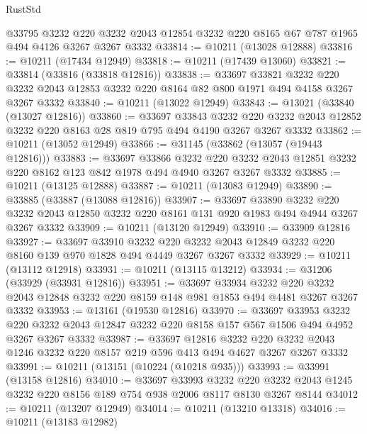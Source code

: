 \begin{lexlean}{RustStd}
\begin{coremodule}
{\begin{coremodule}
{{{{{{{{{{{{{{{{{{{{{{{{{    @33795
    @3232
    @220
    @3232
    @2043
    @12854
    @3232
    @220
    @8165
    @67
    @787
    @1965
    @494
    @4126
    @3267
    @3267
    @3332
@33814 := @10211 (@13028 @12888)
@33816 := @10211 (@17434 @12949)
@33818 := @10211 (@17439 @13060)
@33821 := @33814 (@33816 (@33818 @12816))
@33838 := @33697
    @33821
    @3232
    @220
    @3232
    @2043
    @12853
    @3232
    @220
    @8164
    @82
    @800
    @1971
    @494
    @4158
    @3267
    @3267
    @3332
@33840 := @10211 (@13022 @12949)
@33843 := @13021 (@33840 (@13027 @12816))
@33860 := @33697
    @33843
    @3232
    @220
    @3232
    @2043
    @12852
    @3232
    @220
    @8163
    @28
    @819
    @795
    @494
    @4190
    @3267
    @3267
    @3332
@33862 := @10211 (@13052 @12949)
@33866 := @31145 (@33862 (@13057 (@19443 @12816)))
@33883 := @33697
    @33866
    @3232
    @220
    @3232
    @2043
    @12851
    @3232
    @220
    @8162
    @123
    @842
    @1978
    @494
    @4940
    @3267
    @3267
    @3332
@33885 := @10211 (@13125 @12888)
@33887 := @10211 (@13083 @12949)
@33890 := @33885 (@33887 (@13088 @12816))
@33907 := @33697
    @33890
    @3232
    @220
    @3232
    @2043
    @12850
    @3232
    @220
    @8161
    @131
    @920
    @1983
    @494
    @4944
    @3267
    @3267
    @3332
@33909 := @10211 (@13120 @12949)
@33910 := @33909 @12816
@33927 := @33697
    @33910
    @3232
    @220
    @3232
    @2043
    @12849
    @3232
    @220
    @8160
    @139
    @970
    @1828
    @494
    @4449
    @3267
    @3267
    @3332
@33929 := @10211 (@13112 @12918)
@33931 := @10211 (@13115 @13212)
@33934 := @31206 (@33929 (@33931 @12816))
@33951 := @33697
    @33934
    @3232
    @220
    @3232
    @2043
    @12848
    @3232
    @220
    @8159
    @148
    @981
    @1853
    @494
    @4481
    @3267
    @3267
    @3332
@33953 := @13161 (@19530 @12816)
@33970 := @33697
    @33953
    @3232
    @220
    @3232
    @2043
    @12847
    @3232
    @220
    @8158
    @157
    @567
    @1506
    @494
    @4952
    @3267
    @3267
    @3332
@33987 := @33697
    @12816
    @3232
    @220
    @3232
    @2043
    @1246
    @3232
    @220
    @8157
    @219
    @596
    @413
    @494
    @4627
    @3267
    @3267
    @3332
@33991 := @10211 (@13151 (@10224 (@10218 @935)))
@33993 := @33991 (@13158 @12816)
@34010 := @33697
    @33993
    @3232
    @220
    @3232
    @2043
    @1245
    @3232
    @220
    @8156
    @189
    @754
    @938
    @2006
    @8117
    @8130
    @3267
    @8144
@34012 := @10211 (@13207 @12949)
@34014 := @10211 (@13210 @13318)
@34016 := @10211 (@13183 @12982)
}}}}}}}}}}}}}}}}}}}}}}}}}
\end{coremodule}}
\end{coremodule}
\end{lexlean}

